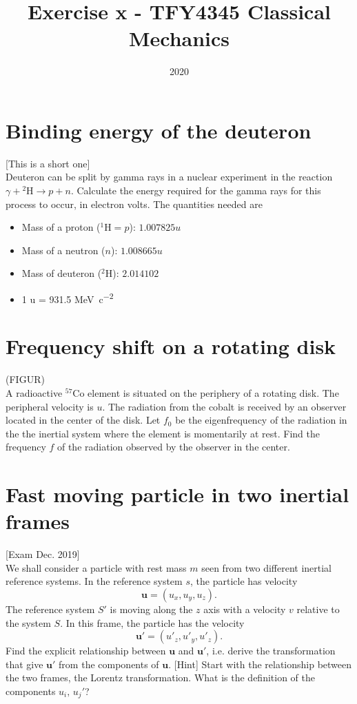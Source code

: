 \documentclass{article}
\title{Exercise x - TFY4345 Classical Mechanics}
\date{2020}
\begin{document}
    \maketitle
    \section{Binding energy of the deuteron}
    [This is a short one] \\
    Deuteron can be split by gamma rays in a nuclear experiment in the reaction $\gamma + {^2\mathrm{H}} \rightarrow p + n$. Calculate the energy required for the gamma rays for this process to occur, in electron volts. The quantities needed are
    \begin{itemize}
        \item Mass of a proton ($^1\mathrm{H} = p$): $1.007825 \si{u}$
        \item Mass of a neutron ($n$): $1.008665 \si{u}$
        \item Mass of deuteron ($^2 \mathrm{H}$): $2.014102$
        \item 1 \si{u} = 931.5 \si{MeV c^{-2}}
    \end{itemize}

    \section{Frequency shift on a rotating disk}
    (FIGUR) \\
    A radioactive $^{57}\mathrm{Co}$ element is situated on the periphery of a rotating disk. The peripheral velocity is $u$. The radiation from the cobalt is received by an observer located in the center of the disk. Let $f_0$ be the eigenfrequency of the radiation in the the inertial system where the element is momentarily at rest. Find the frequency $f$ of the radiation observed by the observer in the center.
    
    \section{Fast moving particle in two inertial frames}
    [Exam Dec. 2019] \\
    We shall consider a particle with rest mass $m$ seen from two different inertial reference systems. In the reference system $s$, the particle has velocity
    \begin{equation*}
        \mathbf{u} = (u_x, u_y, u_z).
    \end{equation*} 
    The reference system $S'$ is moving along the $z$ axis with a velocity $v$ relative to the system $S$. In this frame, the particle has the velocity
    \begin{equation*}
        \mathbf{u'} = (u'_z, u'_y, u'_z).
    \end{equation*}
    Find the explicit relationship between $\mathbf{u}$ and $\mathbf{u'}$, i.e. derive the transformation that give $\mathbf{u'}$ from the components of $\mathbf{u}$. [Hint] Start with the relationship between the two frames, the Lorentz transformation. What is the definition of the components $u_i, \, u_j'$?
\end{document}
